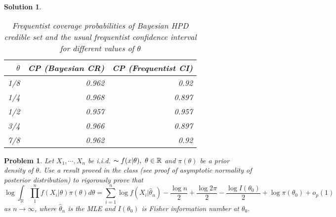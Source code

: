 \documentclass[12pt]{article}
\theoremstyle{problemstyle}
\newtheorem{pbm}{Problem}
\newtheorem*{solution*}{Solution}
\newenvironment{problem}{
\begin{tcolorbox}[colback=green!10!white,colframe=black!75!black, parbox = false]\begin{pbm} }{\end{pbm}\end{tcolorbox} }
\newcommand{\R}{\mathbb{R}}
\begin{document}
\begin{solution*}
    \begin{table}
        \centering
        \begin{tabular}{rrr}
            \toprule
            \textbf{$\theta$} & \textbf{CP (Bayesian CR)} & \textbf{CP (Frequentist CI)}\\
            \midrule
            1/8 & 0.962 & 0.92\\
            1/4 & 0.968 & 0.897\\
            1/2 & 0.957 & 0.957\\
            3/4 & 0.966 & 0.897\\
            7/8 & 0.962 & 0.92\\
            \bottomrule
        \end{tabular}
        \caption{Frequentist coverage probabilities of Bayesian HPD credible set and the usual frequentist confidence interval for different values of $\theta$}
    \end{table}
    
\end{solution*}
\pagebreak



\begin{problem}
Let $X_1,\cdots, X_n$ be i.i.d. $\thicksim f(x|\theta),\ \theta \in \R$ and $\pi(\theta)$ be a prior density of $\theta$. Use a result proved in the class (see proof of asymptotic normality of
posterior distribution) to rigorously prove that
$$\log \displaystyle \int_{\R} \prod_1^n f(X_i|\theta)\pi(\theta)d\theta =\sum_{i=1}^n \log f(X_i|\hat{\theta}_n)-\dfrac{\log n}{2} +\dfrac{\log 2\pi}{2} -\dfrac{\log I(\theta_0)}{2}+\log \pi(\theta_0) +o_p(1)  $$
as $n\rightarrow\infty$, where $\hat{\theta}_n$ is the MLE and $I(\theta_0)$ is Fisher information number at $\theta_0$.
\end{problem}
\end{document}
